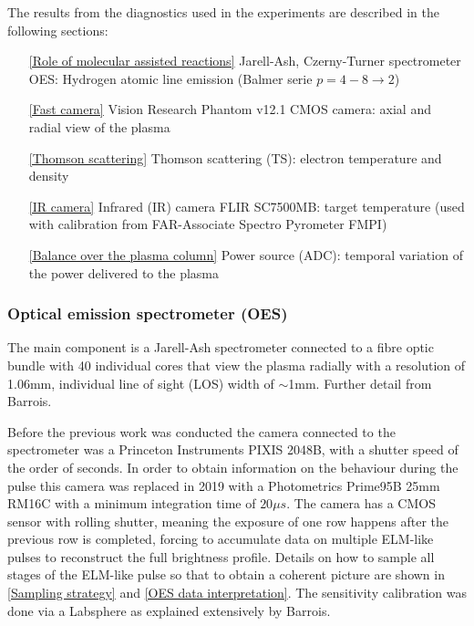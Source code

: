 The results from the diagnostics used in the experiments are described in the following sections:
\begin{enumerate}
    \item[\ref{Role of molecular assisted reactions}] Jarell-Ash, Czerny-Turner spectrometer OES: Hydrogen atomic line emission (Balmer serie $p=4-8 \rightarrow 2$)
    \item[\ref{Fast camera}] Vision Research Phantom v12.1 CMOS camera: axial and radial view of the plasma
    \item[\ref{Thomson scattering}] Thomson scattering (TS): electron temperature and density
    \item[\ref{IR camera}] Infrared (IR) camera FLIR SC7500MB: target temperature (used with calibration from FAR-Associate Spectro Pyrometer FMPI)
    \item[\ref{Balance over the plasma column}] Power source (ADC): temporal variation of the power delivered to the plasma
\end{enumerate}

\subsubsection{Optical emission spectrometer (OES)}\label{Optical emission spectrometer}

The main component is a Jarell-Ash spectrometer connected to a fibre optic bundle with 40 individual cores that view the plasma radially with a resolution of 1.06mm, individual line of sight (LOS) width of $\sim$1mm. Further detail from Barrois. \cite{Science2017}

Before the previous work was conducted the camera connected to the spectrometer was a Princeton Instruments PIXIS 2048B, with a shutter speed of the order of seconds. In order to obtain information on the behaviour during the pulse this camera was replaced in 2019 with a Photometrics Prime95B 25mm RM16C with a minimum integration time of $20\mu s$. The camera has a CMOS sensor with rolling shutter, meaning the exposure of one row happens after the previous row is completed, forcing to accumulate data on multiple ELM-like pulses to reconstruct the full brightness profile. Details on how to sample all stages of the ELM-like pulse so that to obtain a coherent picture are shown in \autoref{Sampling strategy} and \ref{OES data interpretation}. The sensitivity calibration was done via a Labsphere as explained extensively by Barrois. \cite{Science2017}


